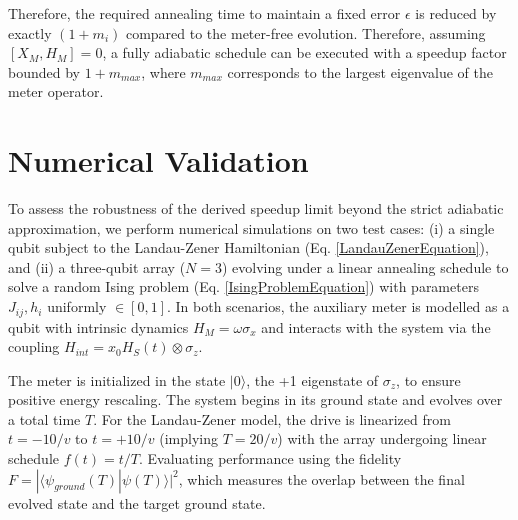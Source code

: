 \qquad Therefore, the required annealing time to maintain a fixed error $\epsilon$ is reduced by exactly $(1+m_i)$ compared to the meter-free evolution. Therefore, assuming $[X_M, H_M] = 0$, a fully adiabatic schedule can be executed with a speedup factor bounded by $1 + m_{max}$, where $m_{max}$ corresponds to the largest eigenvalue of the meter operator. 


\section{Numerical Validation}

\qquad To assess the robustness of the derived speedup limit beyond the strict adiabatic approximation, we perform numerical simulations on two test cases: (i) a single qubit subject to the Landau-Zener Hamiltonian (Eq. \ref{LandauZenerEquation}), and (ii) a three-qubit array ($N=3$) evolving under a linear annealing schedule to solve a random Ising problem (Eq. \ref{IsingProblemEquation}) with parameters $J_{ij}, h_i$ uniformly $ \in [0, 1]$. In both scenarios, the auxiliary meter is modelled as a qubit with intrinsic dynamics $H_M = \omega \sigma_x$ and interacts with the system via the coupling $H_{int} = x_0 H_S(t) \otimes \sigma_z$.

\qquad The meter is initialized in the state $|0\rangle$, the +1 eigenstate of $\sigma_z$, to ensure positive energy rescaling. The system begins in its ground state and evolves over a total time $T$. For the Landau-Zener model, the drive is linearized from $t = -10/v$ to $t = +10/v$ (implying $T=20/v$) with the array undergoing linear schedule $f(t) = t/T$. Evaluating performance using the fidelity $F = |\langle \psi_{ground}(T) | \psi(T) \rangle|^2$, which measures the overlap between the final evolved state and the target ground state.

